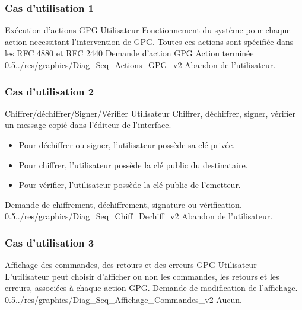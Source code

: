 \documentclass{../res/univ-projet}
\begin{document}
\subsubsection{Cas d'utilisation 1}
\ficheGraphic
{Exécution d'actions GPG}
{Utilisateur}
{
  Fonctionnement du système pour chaque action
  necessitant l'intervention de GPG.
  Toutes ces actions sont spécifiée dans les
  \newline
  \href{file:../../ressources/openPGP/rfc4880-en.pdf}{RFC 4880}
  et \href{file:../../ressources/openPGP/rfc2440-fr.pdf}{RFC 2440}
}
{}
{Demande d'action GPG}
{Action terminée}
{0.5}{../res/graphics/Diag_Seq_Actions_GPG_v2}
{Abandon de l'utilisateur.}
\vspace{0.5cm}

  \subsubsection{Cas d'utilisation 2}
\ficheGraphic
{Chiffrer/déchiffrer/Signer/Vérifier}
{Utilisateur}
{Chiffrer, déchiffrer, signer, vérifier un message copié dans l'éditeur de l'interface.}
{\begin{itemize}
 \item Pour déchiffrer ou signer, l'utilisateur possède sa clé privée.
 \item Pour chiffrer, l'utilisateur possède la clé public du destinataire.
 \item Pour vérifier, l'utilisateur possède la clé public de l'emetteur.
 \end{itemize}
}
{Demande de chiffrement, déchiffrement, signature ou vérification.}
{}
{0.5}{../res/graphics/Diag_Seq_Chiff_Dechiff_v2}
{Abandon de l'utilisateur.}
\vspace{0.5cm}

  \subsubsection{Cas d'utilisation 3}
\ficheGraphic
{Affichage des commandes, des retours et des erreurs GPG}
{Utilisateur}
{L'utilisateur peut choisir d'afficher ou non les commandes, les retours et les erreurs, associées à chaque action GPG.}
{}
{Demande de modification de l'affichage.}
{}
{0.5}{../res/graphics/Diag_Seq_Affichage_Commandes_v2}
{Aucun.}   
\vspace{0.5cm}
\end{document}
